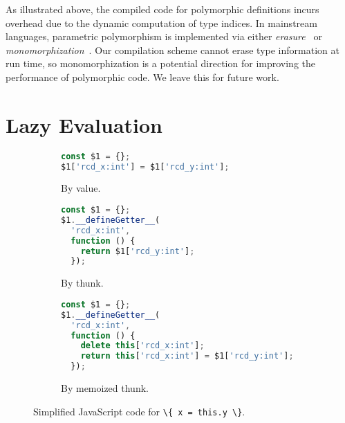 As illustrated above, the compiled code for polymorphic definitions incurs
overhead due to the dynamic computation of type indices. In mainstream
languages, parametric polymorphism is implemented via either
\emph{erasure}~\citep{igarashi2001featherweight} or
\emph{monomorphization}~\citep{griesemer2020featherweight}. Our compilation
scheme cannot erase type information at run time, so monomorphization is a
potential direction for improving the performance of polymorphic code. We leave
this for future work.

\section{Lazy Evaluation}

\begin{figure}
\begin{subfigure}{.25\textwidth}
\begin{lstlisting}[language=TypeScript,showlines]
const $1 = {};
$1['rcd_x:int'] = $1['rcd_y:int'];

\end{lstlisting}
\caption{By value.} \label{fig:call-by-value}
\end{subfigure}
\begin{subfigure}{.34\textwidth}
\begin{lstlisting}[language=TypeScript]
const $1 = {};
$1.__defineGetter__(
  'rcd_x:int',
  function () {
    return $1['rcd_y:int'];
  });
\end{lstlisting}
\caption{By thunk.} \label{fig:call-by-name}
\end{subfigure}
\begin{subfigure}{.39\textwidth}
\begin{lstlisting}[language=TypeScript]
const $1 = {};
$1.__defineGetter__(
  'rcd_x:int',
  function () {
    delete this['rcd_x:int'];
    return this['rcd_x:int'] = $1['rcd_y:int'];
  });
\end{lstlisting}
\caption{By memoized thunk.} \label{fig:call-by-need}
\end{subfigure}
\caption{Simplified JavaScript code for \lstinline|\{ x = this.y \}|.}
\end{figure}

